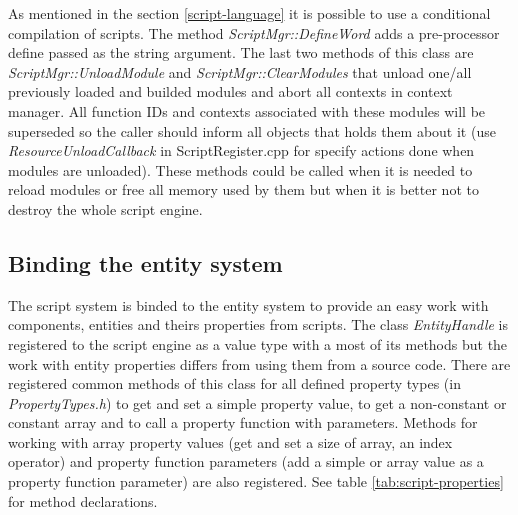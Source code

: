 
As mentioned in the section \ref{script-language} it is possible to use a conditional compilation of scripts. The method \emph{ScriptMgr::DefineWord} adds a pre-processor define passed as the string argument. The last two methods of this class are \emph{ScriptMgr::UnloadModule} and \emph{ScriptMgr::ClearModules} that unload one/all previously loaded and builded modules and abort all contexts in context manager. All function IDs and contexts associated with these modules will be superseded so the caller should inform all objects that holds them about it (use \emph{ResourceUnloadCallback} in ScriptRegister.cpp for specify actions done when modules are unloaded). These methods could be called when it is needed to reload modules or free all memory used by them but when it is better not to destroy the whole script engine.

\subsection{Binding the entity system}
\label{script-entity}

The script system is binded to the entity system to provide an easy work with components, entities and theirs properties from scripts. The class \emph{EntityHandle} is registered to the script engine as a value type with a most of its methods but the work with entity properties differs from using them from a source code. There are registered common methods of this class for all defined property types (in \emph{PropertyTypes.h}) to get and set a simple property value, to get a non-constant or constant array and to call a property function with parameters. Methods for working with array property values (get and set a size of array, an index operator) and property function parameters (add a simple or array value as a property function parameter) are also registered. See table \ref{tab:script-properties} for method declarations.

